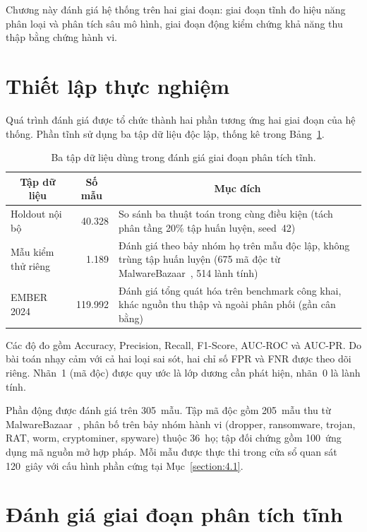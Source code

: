 \documentclass[../DoAn.tex]{subfiles}
\begin{document}
Chương này đánh giá hệ thống trên hai giai đoạn: giai đoạn tĩnh đo hiệu
năng phân loại và phân tích sâu mô hình, giai đoạn động kiểm chứng khả
năng thu thập bằng chứng hành vi.

\section{Thiết lập thực nghiệm}
\label{section:5.1}

Quá trình đánh giá được tổ chức thành hai phần tương ứng hai giai đoạn
của hệ thống. Phần tĩnh sử dụng ba tập dữ liệu độc lập, thống kê trong
Bảng~\ref{tab:eval-datasets}.
\begin{table}[H]
\centering
\caption{Ba tập dữ liệu dùng trong đánh giá giai đoạn phân tích tĩnh.}
\label{tab:eval-datasets}
\begin{tabular}{|l|r|p{6cm}|}
\hline
\multicolumn{1}{|c|}{\textbf{Tập dữ liệu}} & \multicolumn{1}{c|}{\textbf{Số mẫu}} & \multicolumn{1}{c|}{\textbf{Mục đích}} \\
\hline
Holdout nội bộ & 40.328 &
  So sánh ba thuật toán trong cùng điều kiện (tách phân tầng 20\%
  tập huấn luyện, seed~42) \\
\hline
Mẫu kiểm thử riêng & 1.189 &
  Đánh giá theo bảy nhóm họ trên mẫu độc lập, không trùng tập huấn
  luyện (675 mã độc từ MalwareBazaar~\cite{malwarebazaar}, 514 lành tính) \\
\hline
EMBER 2024~\cite{joyce2025ember} & 119.992 &
  Đánh giá tổng quát hóa trên benchmark công khai, khác nguồn thu thập
  và ngoài phân phối (gần cân bằng) \\
\hline
\end{tabular}
\end{table}
Các độ đo gồm Accuracy, Precision, Recall, F1-Score, AUC-ROC và
AUC-PR. Do bài toán nhạy cảm với cả hai loại sai sót, hai chỉ số FPR
và FNR được theo dõi riêng.
Nhãn~1 (mã độc) được quy ước là lớp dương cần phát hiện, nhãn~0 là lành
tính.

Phần động được đánh giá trên 305~mẫu. Tập mã độc gồm 205~mẫu thu từ
MalwareBazaar~\cite{malwarebazaar}, phân bố trên bảy nhóm hành vi
(dropper, ransomware, trojan, RAT, worm, cryptominer, spyware) thuộc
36~họ; tập đối chứng gồm 100~ứng dụng mã nguồn mở hợp pháp. Mỗi mẫu được
thực thi trong cửa sổ quan sát 120~giây với cấu hình phần cứng tại
Mục~\ref{section:4.1}.

\section{Đánh giá giai đoạn phân tích tĩnh}
\label{section:5.2}
\end{document}
